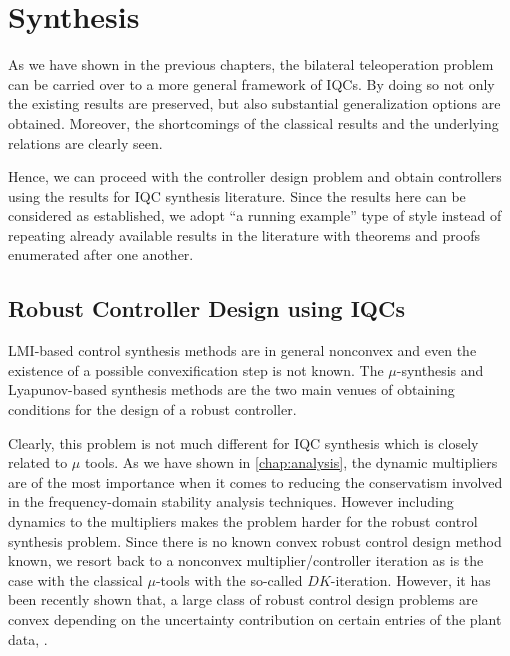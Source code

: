 \chapter{Synthesis}
\label{chap:synth}

As we have shown in the previous chapters, the bilateral teleoperation problem can be carried over to a more general
framework of IQCs. By doing so not only the existing results are preserved, but also substantial generalization
options are obtained. Moreover, the shortcomings of the classical results and the underlying relations are clearly 
seen. 

Hence, we can proceed with the controller design problem and obtain controllers using the results for IQC synthesis
literature. Since the results here can be considered as established, we adopt \enquote{a running example} type of style 
instead of repeating already available results in the literature with theorems and proofs enumerated after one another.

\section{Robust Controller Design using IQCs}
LMI-based control synthesis methods are in general nonconvex and even the existence of a possible convexification step 
is not known. The $\mu$-synthesis and Lyapunov-based synthesis methods are the two main venues of obtaining conditions
for the design of a robust controller. 

Clearly, this problem is not much different for IQC synthesis which is closely related to $\mu$
tools. As we have shown in \cref{chap:analysis}, the dynamic multipliers are of the most importance when it comes to 
reducing the conservatism involved in the frequency-domain stability analysis techniques. However including dynamics 
to the multipliers makes the problem harder for the robust control synthesis problem. Since there is no known convex 
robust control design method known, we resort back to a nonconvex multiplier/controller iteration as is the case with 
the classical $\mu$-tools with the so-called $DK$-iteration. However, it has been recently shown that, a large class
of robust control design problems are convex depending on the uncertainty contribution on certain entries of the plant 
data, \cite{scherer2009}. 
